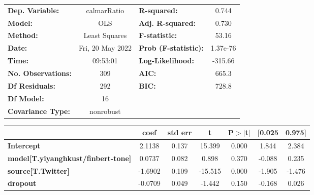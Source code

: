 \begin{center}
\begin{tabular}{lclc}
\toprule
\textbf{Dep. Variable:}                    &   calmarRatio    & \textbf{  R-squared:         } &     0.744   \\
\textbf{Model:}                            &       OLS        & \textbf{  Adj. R-squared:    } &     0.730   \\
\textbf{Method:}                           &  Least Squares   & \textbf{  F-statistic:       } &     53.16   \\
\textbf{Date:}                             & Fri, 20 May 2022 & \textbf{  Prob (F-statistic):} &  1.37e-76   \\
\textbf{Time:}                             &     09:53:01     & \textbf{  Log-Likelihood:    } &   -315.66   \\
\textbf{No. Observations:}                 &         309      & \textbf{  AIC:               } &     665.3   \\
\textbf{Df Residuals:}                     &         292      & \textbf{  BIC:               } &     728.8   \\
\textbf{Df Model:}                         &          16      & \textbf{                     } &             \\
\textbf{Covariance Type:}                  &    nonrobust     & \textbf{                     } &             \\
\bottomrule
\end{tabular}
\begin{tabular}{lcccccc}
                                           & \textbf{coef} & \textbf{std err} & \textbf{t} & \textbf{P$> |$t$|$} & \textbf{[0.025} & \textbf{0.975]}  \\
\midrule
\textbf{Intercept}                         &       2.1138  &        0.137     &    15.399  &         0.000        &        1.844    &        2.384     \\
\textbf{model[T.yiyanghkust/finbert-tone]} &       0.0737  &        0.082     &     0.898  &         0.370        &       -0.088    &        0.235     \\
\textbf{source[T.Twitter]}                 &      -1.6902  &        0.109     &   -15.515  &         0.000        &       -1.905    &       -1.476     \\
\textbf{dropout}                           &      -0.0709  &        0.049     &    -1.442  &         0.150        &       -0.168    &        0.026     \\

\end{tabular}
\end{center}
